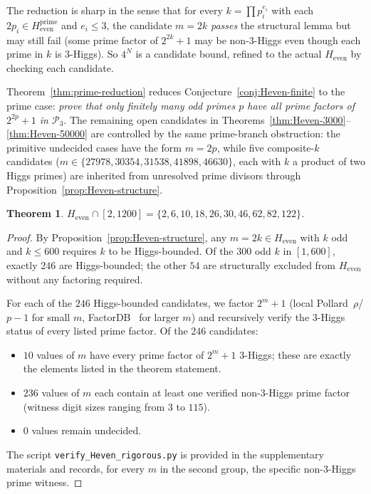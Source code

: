 \documentclass[11pt]{amsart}
\theoremstyle{plain}
\newtheorem{theorem}{Theorem}
\theoremstyle{definition}
\begin{document}
\noindent The reduction is sharp in the sense that for every
$k = \prod p_i^{e_i}$ with each $2p_i \in H_{\mathrm{even}}^{\mathrm{prime}}$
and $e_i \le 3$, the candidate $m = 2k$ \emph{passes} the structural
lemma but may still fail (some prime factor of $2^{2k}+1$ may be
non-3-Higgs even though each prime in $k$ is 3-Higgs). So $4^N$ is a
candidate bound, refined to the actual $H_{\mathrm{even}}$ by checking
each candidate.

\smallskip
Theorem~\ref{thm:prime-reduction} reduces
Conjecture~\ref{conj:Heven-finite} to the prime case:
\emph{prove that only finitely many odd primes $p$ have all prime
factors of $2^{2p}+1$ in $\mathcal{P}_3$}. The remaining open candidates in Theorems~\ref{thm:Heven-3000}--\ref{thm:Heven-50000}
are controlled by the same prime-branch obstruction: the primitive
undecided cases have the form $m=2p$, while five composite-$k$
candidates ($m \in \{27978, 30354, 31538, 41898, 46630\}$, each with
$k$ a product of two Higgs primes) are inherited from unresolved
prime divisors through Proposition~\ref{prop:Heven-structure}.

\begin{theorem}\label{thm:Heven-1200}
$H_{\mathrm{even}} \cap [2, 1200] = \{ 2, 6, 10, 18, 26, 30, 46, 62, 82, 122 \}$.
\end{theorem}

\begin{proof}
By Proposition~\ref{prop:Heven-structure}, any $m = 2k \in
H_{\mathrm{even}}$ with $k$ odd and $k \le 600$ requires $k$ to be
Higgs-bounded. Of the $300$ odd $k$ in $[1, 600]$, exactly $246$ are
Higgs-bounded; the other $54$ are structurally excluded from
$H_{\mathrm{even}}$ without any factoring required.

For each of the $246$ Higgs-bounded candidates, we factor $2^m + 1$
(local Pollard~$\rho$/$p-1$ for small $m$, FactorDB~\cite{FactorDB}
for larger $m$) and recursively verify the 3-Higgs status of every
listed prime factor.
Of the $246$ candidates:
\begin{itemize}
\item $10$ values of $m$ have every prime factor of $2^m+1$ 3-Higgs;
these are exactly the elements listed in the theorem statement.
\item $236$ values of $m$ each contain at least one verified
non-3-Higgs prime factor (witness digit sizes ranging from $3$ to
$115$).
\item $0$ values remain undecided.
\end{itemize}
The script \texttt{verify\_Heven\_rigorous.py} is provided in the
supplementary materials and records, for every $m$ in the second
group, the specific non-3-Higgs prime witness.
\end{proof}
\end{document}

